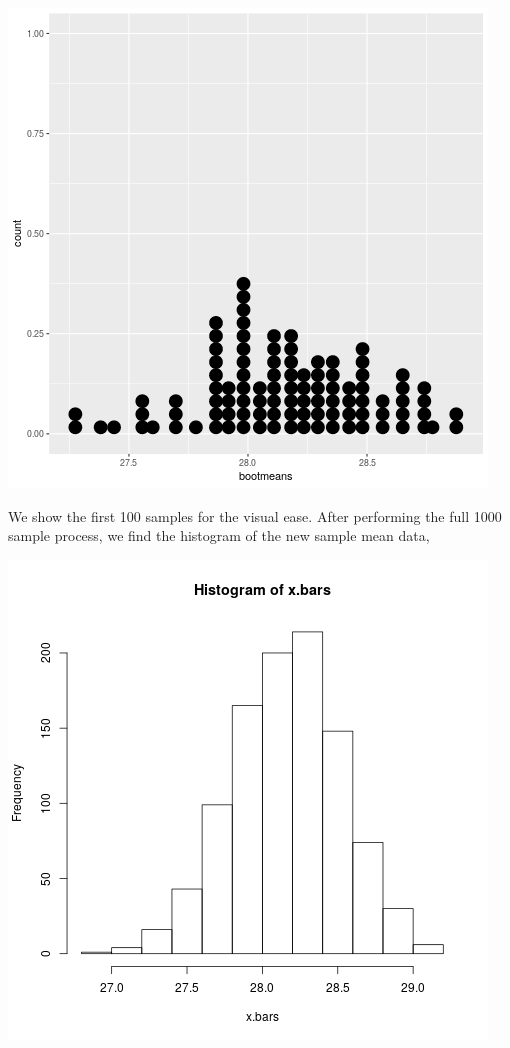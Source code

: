 \documentclass[letterpaper,10pt]{article}
\begin{document}
\begin{enumerate}
\begin{enumerate}
\begin{center}
\includegraphics[scale=.65]{econdot.png}
\end{center}
We show the first 100 samples for the visual ease. After performing the full 1000 sample process, we find the histogram of the new sample mean data,
\begin{center}
\includegraphics[scale=.65]{econhist.png}

\end{center}
\end{enumerate}
\end{enumerate}
\end{document}
